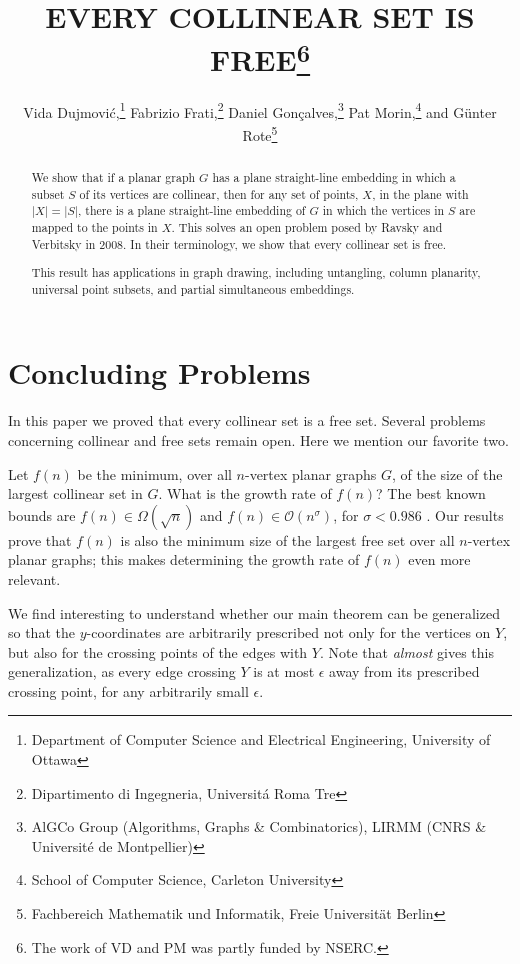\documentclass{patmorin}
\title{\MakeUppercase{Every Collinear Set Is Free}\thanks{%
    The work of VD and PM was partly funded by NSERC.}}
\author{Vida Dujmovi\'c,\thanks{Department of Computer Science and Electrical Engineering, University of Ottawa}\quad
        Fabrizio Frati,\thanks{Dipartimento di Ingegneria, Universit\'a Roma Tre}\quad 
        Daniel Gon\c{c}alves,\thanks{AlGCo Group (Algorithms, Graphs \& Combinatorics), LIRMM (CNRS \& Universit\'{e} de Montpellier)}\quad
        Pat Morin,\thanks{School of Computer Science, Carleton University}\quad 
        and G\"unter Rote\thanks{Fachbereich Mathematik und Informatik, Freie Universit\"at Berlin}}
\begin{document}
\maketitle


\begin{abstract}
  We show that if a planar graph $G$ has a plane straight-line embedding
   in which a subset $S$ of its vertices are collinear, then for any
   set of points, $X$, in the plane with $|X|=|S|$, there is a plane
  straight-line embedding of $G$ in which the vertices in $S$ are
  mapped to the points in $X$.  This solves an open problem posed by
  Ravsky and Verbitsky in 2008.  In their terminology, we show that
  every collinear set is free.
  
  This result has applications in graph drawing, including untangling,
  column planarity, universal point subsets, and partial simultaneous
  embeddings.
\end{abstract}






\section{Concluding Problems}

In this paper we proved that every collinear set is a free set. Several problems concerning collinear and free sets remain open. Here we mention our favorite two.

Let $f(n)$ be the minimum, over all $n$-vertex planar graphs $G$, of the size of the largest collinear set in $G$. What is the growth rate of $f(n)$? The best known bounds are $f(n)\in\Omega(\sqrt{n})$ and $f(n)\in \mathcal{O}(n^\sigma)$, for $\sigma < 0.986$ \cite{bose.dujmovic.ea:polynomial,ravsky.verbitsky:on}. Our results prove that $f(n)$ is also the minimum size of the largest free set over all $n$-vertex planar graphs; this makes determining the growth rate of $f(n)$ even more relevant.
%

We find interesting to understand whether our main theorem can be generalized so that the $y$-coordinates are arbitrarily prescribed not only for the vertices on $Y$, but also for the crossing points of the edges with $Y$. Note that  {\em almost} gives this generalization, as every edge crossing $Y$ is at most $\epsilon$ away from its prescribed crossing point, for any arbitrarily small $\epsilon$. 
\end{document}
